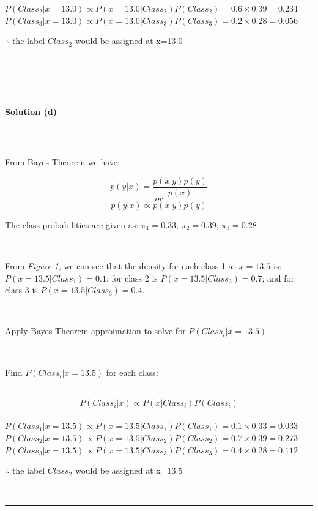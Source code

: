 \documentclass{article}
\begin{document}
$P(Class_2|x=13.0) \propto P(x=13.0|Class_2)P(Class_2) = 0.6 \times 0.39 = 0.234$\\

$P(Class_3|x=13.0) \propto P(x=13.0|Class_3)P(Class_3) = 0.2 \times 0.28 = 0.056$\\

\parbox{\textwidth}{$\therefore$ the label $Class_2$ would be assigned at x=13.0}\\

\noindent\rule{\textwidth}{0.4pt}\\

\parbox{\textwidth}{\textbf{Solution (d)}}
\noindent\rule{\textwidth}{0.4pt}\\

\parbox{\textwidth}{From Bayes Theorem we have:}
$$p(y|x) = \frac{p(x|y)p(y)}{p(x)}$$
$$or$$
$$p(y|x) \propto p(x|y)p(y)$$

\parbox{\textwidth}{The class probabilities are given as: $\pi_1 = 0.33$; $\pi_2 = 0.39$; $\pi_3 = 0.28$}\\

\parbox{\textwidth}{From \textit{Figure 1}, we can see that the density for each class 1 at $x=13.5$ is: $P(x=13.5|Class_1) = 0.1$; for class 2 is $P(x=13.5|Class_2) = 0.7$; and for class 3 is $P(x=13.5|Class_3) = 0.4$.}\\

\parbox{\textwidth}{Apply Bayes Theorem approimation to solve for $P(Class_i | x=13.5)$}\\

\parbox{\textwidth}{Find $P(Class_i|x=13.5)$ for each class:}\\

$$P(Class_i|x) \propto P(x|Class_i)P(Class_i)$$\\

$P(Class_1|x=13.5) \propto P(x=13.5|Class_1)P(Class_1) = 0.1 \times 0.33 = 0.033$\\

$P(Class_2|x=13.5) \propto P(x=13.5|Class_2)P(Class_2) = 0.7 \times 0.39 = 0.273$\\

$P(Class_3|x=13.5) \propto P(x=13.5|Class_3)P(Class_3) = 0.4 \times 0.28 = 0.112$\\

\parbox{\textwidth}{$\therefore$ the label $Class_2$ would be assigned at x=13.5}\\

\noindent\rule{\textwidth}{0.4pt}\\
\end{document}
